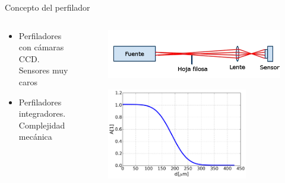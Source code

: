 \begin{frame}[fragile]{Concepto del perfilador}

    \begin{columns}
        \begin{column}{0.5\textwidth}
        
            \begin{itemize}
                \item Perfiladores con cámaras CCD. Sensores muy caros
                \item Perfiladores integradores. Complejidad mecánica
            \end{itemize}
        \end{column}
        
        \begin{column}{0.5\textwidth}
            \begin{figure}[H]
            \centering
            \includegraphics[width=\textwidth]{fig/perfilador/esquema_basico}
            \label{fig:perfilador/esquema_basico}
            \end{figure}
            \begin{figure}
                \centering
                \includegraphics[width=0.8\textwidth]{fig/perfilador/err_function.png}
                \label{fig:perfilador/err_function}
            \end{figure}
        \end{column}
    \end{columns}



\end{frame}

